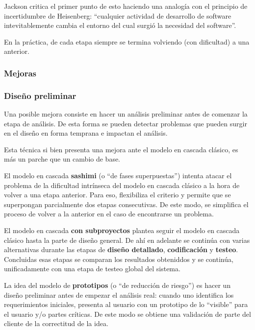 \documentclass[]{article}
\begin{document}
Jackson critica el primer punto de esto haciendo una analogía con el principio de incertidumbre de Heisenberg: ``cualquier actividad de desarrollo de software intevitablemente cambia el entorno del cual surgió la necesidad del software''.

En la práctica, de cada etapa siempre se termina volviendo (con dificultad) a una anterior.

\subsubsection{Mejoras}
\subsubsection{Diseño preliminar}
Una posible mejora consiste en hacer un análisis preliminar antes de comenzar la etapa de análisis. De esta forma se pueden detectar problemas que pueden surgir en el diseño en forma temprana e impactan el análisis.

Esta técnica si bien presenta una mejora ante el modelo en cascada clásico, es más un parche que un cambio de base.


El modelo en cascada \textbf{sashimi} (o ``de fases superpuestas'') intenta atacar el problema de la dificultad intrínseca del modelo en cascada clásico a la hora de volver a una etapa anterior. Para eso, flexibiliza el criterio y permite que se superpongan parcialmente dos etapas consecutivas. De este modo, se simplifica el proceso de volver a la anterior en el caso de encontrarse un problema.


El modelo en cascada \textbf{con subproyectos} plantea seguir el modelo en cascada clásico hasta la parte de diseño general. De ahí en adelante se continúa con varias alternativas durante las etapas de \textbf{diseño detallado}, \textbf{codificación} y \textbf{testeo}. Concluidas esas etapas
se comparan los resultados obteniddos y se continúa, unificadamente con una etapa de testeo global del sistema.



La idea del modelo de \textbf{prototipos} (o ``de reducción de riesgo'') es hacer un diseño preliminar antes de empezar el análisis real: cuando uno identifica los requerimientos iniciales, presenta al usuario con un prototipo de lo ``visible'' para el usuario y/o partes críticas. De este modo se obtiene una validación de parte del cliente de la correctitud de la idea.
\end{document}
